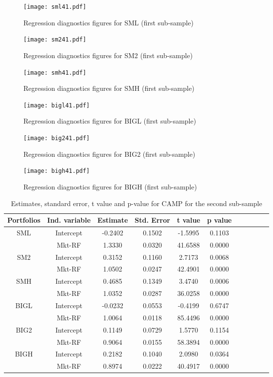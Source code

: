 \documentclass[11pt]{article}
\begin{document}
\begin{figure}
\texttt{[image: sml41.pdf]}
\caption{Regression diagnostics figures for SML (first sub-sample) }
\label{sml41}
\end{figure}
\begin{figure}
\texttt{[image: sm241.pdf]}
\caption{Regression diagnostics figures for SM2 (first sub-sample)}
\label{sm241}
\end{figure}
\begin{figure}
\texttt{[image: smh41.pdf]}
\caption{Regression diagnostics figures for SMH (first sub-sample)}
\label{smh41}
\end{figure}
\begin{figure}
\texttt{[image: bigl41.pdf]}
\caption{Regression diagnostics figures for BIGL (first sub-sample)}
\label{bigl41}
\end{figure}
\FloatBarrier
\begin{figure}
\texttt{[image: big241.pdf]}
\caption{Regression diagnostics figures for BIG2 (first sub-sample)}
\label{big241}
\end{figure}
\begin{figure}
\centering
\texttt{[image: bigh41.pdf]}
\caption{Regression diagnostics figures for BIGH (first sub-sample)}
\label{bigh41}
\end{figure}





\begin{table}
\centering
\begin{tabular}{ccccccccccc}
  \hline
 Portfolios&Ind. variable& Estimate & Std. Error & t value & p value \\ 
  \hline
SML&Intercept   & -0.2402 & 0.1502 & -1.5995 & 0.1103 \\ 
  &Mkt-RF & 1.3330 & 0.0320 & 41.6588 & 0.0000 \\ 
  SM2&Intercept   & 0.3152 & 0.1160 & 2.7173 & 0.0068 \\ 
  &Mkt-RF & 1.0502 & 0.0247 & 42.4901 & 0.0000 \\ 
  SMH&Intercept   & 0.4685 & 0.1349 & 3.4740 & 0.0006 \\ 
  &Mkt-RF & 1.0352 & 0.0287 & 36.0258 & 0.0000 \\ 
  BIGL&Intercept   & -0.0232 & 0.0553 & -0.4199 & 0.6747 \\ 
  &Mkt-RF & 1.0064 & 0.0118 & 85.4496 & 0.0000 \\ 
  BIG2&Intercept   & 0.1149 & 0.0729 & 1.5770 & 0.1154 \\ 
  &Mkt-RF & 0.9064 & 0.0155 & 58.3894 & 0.0000 \\ 
  BIGH&Intercept   & 0.2182 & 0.1040 & 2.0980 & 0.0364 \\ 
  &Mkt-RF & 0.8974 & 0.0222 & 40.4917 & 0.0000 \\ 
   \hline
\end{tabular}
\caption{ Estimates, standard error, t value and p-value for CAMP for the second sub-sample}\label{tab3}
\end{table}
\end{document}
